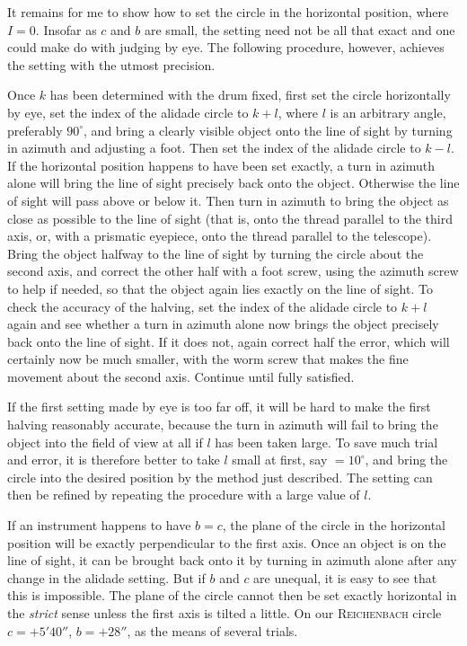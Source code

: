 \par\indent It remains for me to show how to set the circle in the horizontal position, where $I=0$. Insofar as $c$ and $b$ are small, the setting need not be all that exact and one could make do with judging by eye. The following procedure, however, achieves the setting with the utmost precision.

\par\indent Once $k$ has been determined with the drum fixed, first set the circle horizontally by eye, set the index of the alidade circle to $k+l$, where $l$ is an arbitrary angle, preferably $90^\circ$, and bring a clearly visible object onto the line of sight by turning in azimuth and adjusting a foot. Then set the index of the alidade circle to $k-l$. If the horizontal position happens to have been set exactly, a turn in azimuth alone will bring the line of sight precisely back onto the object. Otherwise the line of sight will pass above or below it. Then turn in azimuth to bring the object as close as possible to the line of sight (that is, onto the thread parallel to the third axis, or, with a prismatic eyepiece, onto the thread parallel to the telescope). Bring the object halfway to the line of sight by turning the circle about the second axis, and correct the other half with a foot screw, using the azimuth screw to help if needed, so that the object again lies exactly on the line of sight. To check the accuracy of the halving, set the index of the alidade circle to $k+l$ again and see whether a turn in azimuth alone now brings the object precisely back onto the line of sight. If it does not, again correct half the error, which will certainly now be much smaller, with the worm screw that makes the fine movement about the second axis. Continue until fully satisfied.

\par\indent If the first setting made by eye is too far off, it will be hard to make the first halving reasonably accurate, because the turn in azimuth will fail to bring the object into the field of view at all if $l$ has been taken large. To save much trial and error, it is therefore better to take $l$ small at first, say $=10^\circ$, and bring the circle into the desired position by the method just described. The setting can then be refined by repeating the procedure with a large value of $l$.

\par\indent If an instrument happens to have $b=c$, the plane of the circle in the horizontal position will be exactly perpendicular to the first axis. Once an object is on the line of sight, it can be brought back onto it by turning in azimuth alone after any change in the alidade setting.  But if $b$ and $c$ are unequal, it is easy to see that this is impossible. The plane of the circle cannot then be set exactly horizontal in the \emph{strict} sense unless the first axis is tilted a little. On our \textsc{Reichenbach} circle $c=+5'40''$, $b=+28''$, as the means of several trials.

